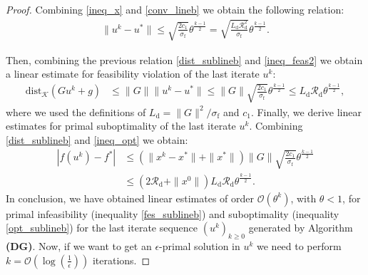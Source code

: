 \documentclass{gOMS2e}
\theoremstyle{plain}
\theoremstyle{definition}
\theoremstyle{remark}
\begin{document}
\begin{proof}
Combining \eqref{ineq_x} and \eqref{conv_lineb} we obtain the
following  relation:
\begin{align}
\label{dist_sublineb} \| u^k - u^* \| \leq
\sqrt{\frac{2c_1}{\sigma_\text{f}}} \theta^{\frac{k-1}{2}} = \sqrt{\frac{{L_{\mathrm{d}}} \mathcal{R}_\text{d}^2}{\sigma_\text{f}}} \theta^{\frac{k-1}{2}}.
\end{align}

\noindent Then, combining the previous relation
\eqref{dist_sublineb} and \eqref{ineq_feas2} we obtain a linear
estimate for feasibility violation of the last iterate $u^k$:
\begin{align}
\label{fes_sublineb} \text{dist}_{\mathcal{K}}(G u^k + g) & \leq   \|G\|  \| {}{u}^k - u^* \|
  \leq  \|G\| \sqrt{\frac{2c_1}{\sigma_\text{f}}}
\theta^{\frac{k-1}{2}}    \leq  L_\text{d} \mathcal{R}_\text{d}
\theta^{\frac{k-1}{2}},
\end{align}
where we used the definitions of  $L_\text{d} =
\|G\|^2/\sigma_\text{f}$ and $c_1$. Finally, we derive linear
estimates for primal suboptimality of the last iterate $u^k$.
Combining \eqref{dist_sublineb} and \eqref{ineq_opt} we obtain:
\begin{align}
\label{opt_sublineb} |f(u^k) - f^*| & \leq   ( \| x^k - x^*\| +
\|x^*\|) \|G\|   \sqrt{\frac{2c_1}{\sigma_\text{f}}} \theta^{\frac{k-1}{2}} \nonumber \\
&  \leq  (2  \mathcal{R}_\text{d} + \|x^0\|) L_\text{d}
\mathcal{R}_\text{d} \theta^{\frac{k-1}{2}}.
\end{align}
In conclusion, we have obtained linear estimates  of order
$\mathcal{O}(\theta^k)$, with $\theta<1$, for primal infeasibility
(inequality \eqref{fes_sublineb}) and  suboptimality (inequality
\eqref{opt_sublineb}) for the last iterate  sequence $(u^k)_{k \geq
0}$ generated by  Algorithm \textbf{(DG)}. Now, if we want to get an
$\epsilon$-primal solution in $u^{k}$ we need to perform $k =
\mathcal{O}(\log(\frac{1}{\epsilon}))$ iterations.
\end{proof}
\end{document}
